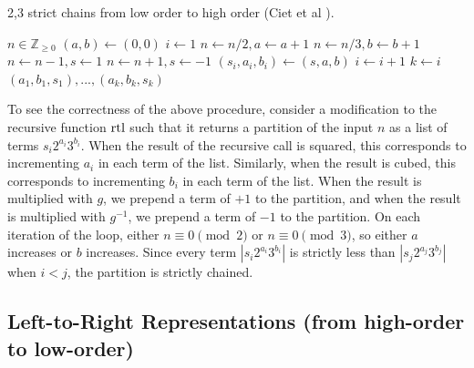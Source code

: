 \documentclass{ucalgthes1}
\theoremstyle{definition}
\newcommand{\ZZgez}{\mathbb{Z}_{\ge 0}}
\begin{document}
\begin{algorithm}[htb]
\caption{2,3 strict chains from low order to high order (Ciet et al \cite{Ciet2006}).}
\label{alg:rtolDbnsChain}
\begin{algorithmic}[1]
\Require $n \in \ZZgez$
\State $(a, b) \gets (0, 0)$
\State $i \gets 1$
		\State $n \gets n / 2, a \gets a + 1$
	\EndWhile
		\State $n \gets n / 3, b \gets b + 1$
	\EndWhile
		\State $n \gets n - 1, s \gets 1$
		\State $n \gets n + 1, s \gets -1$
	\EndIf
	\State $(s_i, a_i, b_i) \gets (s, a, b)$
	\State $i \gets i + 1$
\EndWhile
\State $k \gets i$
\State \Return $(a_1, b_1, s_1), ..., (a_k, b_k, s_k)$
\end{algorithmic}
\end{algorithm}

To see the correctness of the above procedure, consider a modification to the recursive function $\textrm{rtl}$ such that it returns a partition of the input $n$ as a list of terms $s_i2^{a_i}3^{b_i}$. When the result of the recursive call is squared, this corresponds to incrementing $a_i$ in each term of the list.  Similarly, when the result is cubed, this corresponds to incrementing $b_i$ in each term of the list. When the result is multiplied with $g$, we prepend a term of $+1$ to the partition, and when the result is multiplied with $g^{-1}$, we prepend a term of $-1$ to the partition. On each iteration of the loop, either $n \equiv 0 \pmod 2$ or $n \equiv 0 \pmod 3$, so either $a$ increases or $b$ increases. Since every term $|s_i2^{a_i}3^{b_i}|$ is strictly less than $|s_j2^{a_j}3^{b_j}|$ when $i < j$, the partition is strictly chained.


\subsection{Left-to-Right Representations (from high-order to low-order)}
\label{subsec:ltorChains}

\newcommand{\greedyltor}{\textrm{greedy}}
\newcommand{\greedychain}{\textrm{greedy}'}
\newcommand{\greedybound}{\textrm{greedy}''}
\newcommand{\closest}{\textrm{closest}}
\newcommand{\amax}{A}
\newcommand{\bmax}{B}
\end{document}
